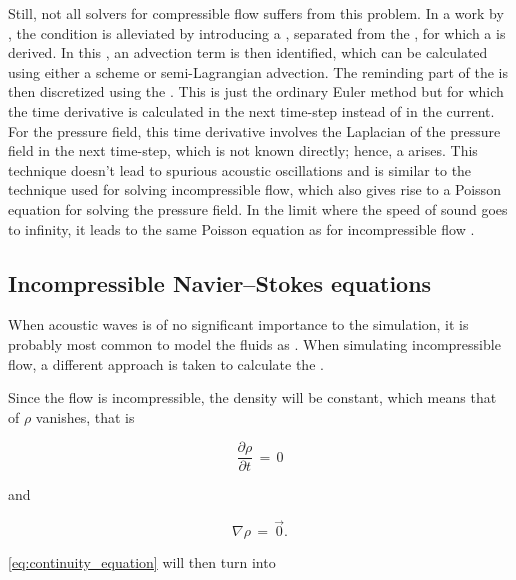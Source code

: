 Still, not all solvers for compressible flow suffers from this problem. In a work by \citet{Kwatra2009}, the \CFL condition is alleviated by introducing a , separated from the , for which a \PDE is derived. In this \PDE, an advection term is then identified, which can be calculated using either a \HO \ENO scheme or semi-Lagrangian advection. The reminding part of the \PDE is then discretized using the . This is just the ordinary Euler method but for which the time derivative is calculated in the next time-step instead of in the current. For the pressure field, this time derivative involves the Laplacian of the pressure field in the next time-step, which is not known directly; hence, a  arises. This technique doesn't lead to spurious acoustic oscillations and is similar to the technique used for solving incompressible flow, which also gives rise to a Poisson equation for solving the pressure field. In the limit where the speed of sound goes to infinity, it leads to the same Poisson equation as for incompressible flow \citep{Kwatra2009}.

\subsection{Incompressible Navier--Stokes equations}

When acoustic waves is of no significant importance to the simulation, it is probably most common to model the fluids as \incompressible. When simulating incompressible flow, a different approach is taken to calculate the .

Since the flow is incompressible, the density will be constant, which means that \derivatives of $\rho$ vanishes, that is

\begin{equation} \label{eq:density_partial_time_derivative_incompressible_flow}
\frac{\partial \rho}{\partial t} \,=\, 0
\end{equation}

and

\begin{equation} \label{eq:density_divergence_incompressible_flow}
\nabla\rho \,=\, \vec{0}.
\end{equation}

\eqref{eq:continuity_equation} will then turn into

